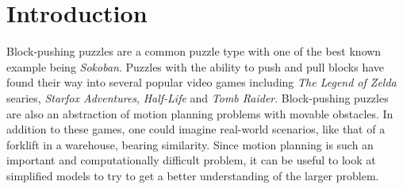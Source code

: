 
\section{Introduction} 

Block-pushing puzzles are a common puzzle type with one of the best known example being \emph{Sokoban}. Puzzles with the ability to push and pull blocks have found their way into several popular video games including \emph{The Legend of Zelda} searies, \emph{Starfox Adventures}, \emph{Half-Life} and \emph{Tomb Raider}. Block-pushing puzzles are also an abstraction of motion planning problems with movable obstacles. In addition to these games, one could imagine real-world scenarios, like that of a forklift in a warehouse, bearing similarity. Since motion planning is such an important and computationally difficult problem, it can be useful to look at simplified models to try to get a better understanding of the larger problem.



